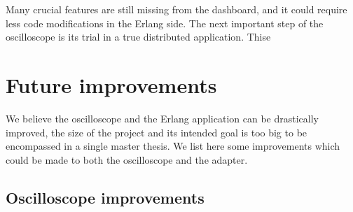     Many crucial features are still missing from the dashboard, and it could require less code modifications in the Erlang side. The next important step of the oscilloscope is its trial in a true distributed application. Thise

    \section{Future improvements}
        We believe the oscilloscope and the Erlang application can be drastically improved, the size of the project and its intended goal is too big to be encompassed in a single master thesis. We list here some improvements which could be made to both the oscilloscope and the adapter.
        \subsection{Oscilloscope improvements}
